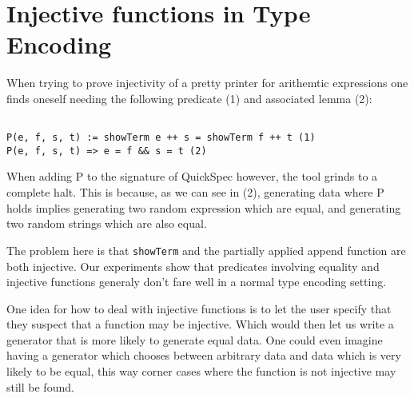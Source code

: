 \section{Injective functions in Type Encoding}
When trying to prove injectivity of a pretty printer for arithemtic expressions one
finds oneself needing the following predicate (1) and associated lemma (2):
\begin{verbatim}

P(e, f, s, t) := showTerm e ++ s = showTerm f ++ t (1)
P(e, f, s, t) => e = f && s = t (2)

\end{verbatim}
When adding P to the signature of QuickSpec however, the tool grinds to a complete halt. This is
because, as we can see in (2), generating data where P holds implies generating two
random expression which are equal, and generating two random strings which are also equal.

The problem here is that \texttt{showTerm} and the partially applied append function are both injective.
Our experiments show that predicates involving equality and injective functions generaly don't
fare well in a normal type encoding setting.

One idea for how to deal with injective functions is to let the user specify that they suspect that 
a function may be injective. Which would then let us write a generator that is more likely to generate
equal data. One could even imagine having a generator which chooses between arbitrary data
and data which is very likely to be equal, this way corner cases where the function is not injective may
still be found.
